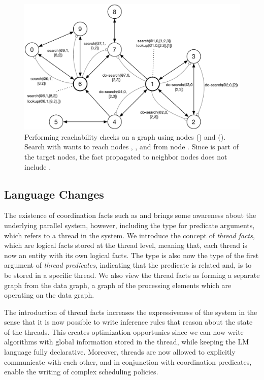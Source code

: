 \begin{figure}[ht]
\begin{center}
   \includegraphics[width=0.9\linewidth]{figures/threads/reach.pdf}
\end{center}
\caption{Performing reachability checks on a graph using nodes 
() and  (). Search with  wants
to reach nodes , , and  from node . Since
 is part of the target nodes, the fact 
propagated to neighbor nodes does not include .}
\label{fig:threads:reach_example}
\end{figure}

\subsection{Language Changes}

The existence of coordination facts such as  and
 brings some awareness about the underlying parallel system,
however, including the type  for predicate arguments, which refers
to a thread in the system. We introduce the concept of \emph{thread facts},
which are logical facts stored at the thread level, meaning that, each thread
is now an entity with its own logical facts. The type  is also now
the type of the first argument of \emph{thread predicates}, indicating that the
predicate is related and, is to be stored in a specific thread. We also view
the thread facts as forming a separate graph from the data graph, a graph of
the processing elements which are operating on the data graph.


The introduction of thread facts increases the expressiveness of the system in
the sense that it is now possible to write inference rules that reason about the
state of the threads. This creates optimization opportunies since we can now
write algorithms with global information stored in the thread, while keeping the
LM language fully declarative. Moreover, threads are now allowed to explicitly
communicate with each other, and in conjunction with coordination predicates,
enable the writing of complex scheduling policies.

